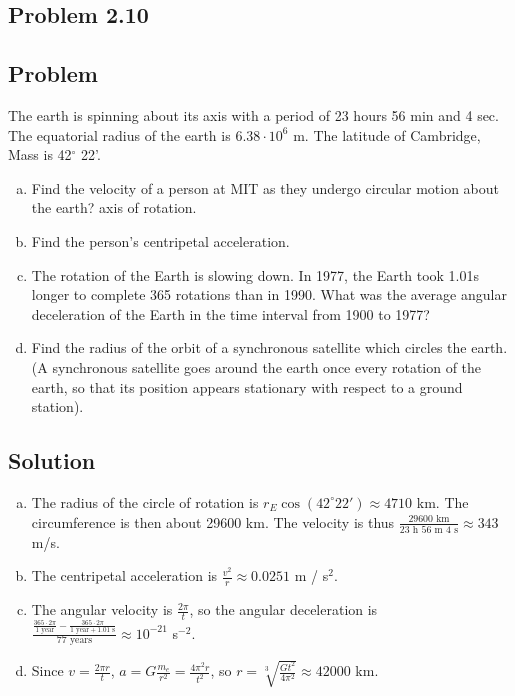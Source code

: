 \documentclass{esg8012pset}
\begin{document}
\begin{question}[Problem 2]
\section*{Problem 2.10}
\subsection*{Problem} The earth is spinning about its axis with a period of 23 hours 56 min and 4 sec. The equatorial radius of the earth is $6.38\cdot 10^{6}$ m. The latitude of Cambridge, Mass is 42$^{\circ}$ 22'.
\begin{enumerate}[a)]
  \item Find the velocity of a person at MIT as they undergo circular motion about the earth? axis of rotation.
  \item Find the person's centripetal acceleration.
  \item The rotation of the Earth is slowing down. In 1977, the Earth took 1.01s longer to complete 365 rotations than in 1990. What was the average angular deceleration of the Earth in the time interval from 1900 to 1977?
  \item Find the radius of the orbit of a synchronous satellite which circles the earth. (A synchronous satellite goes around the earth once every rotation of the earth, so that its position appears stationary with respect to a ground station).
\end{enumerate}
\subsection*{Solution}
\begin{enumerate}[a)]
  \item The radius of the circle of rotation is $r_E \cos(42^{\circ} 22') \approx 4710$ km.  The circumference is then about 29600 km.  The velocity is thus $\frac{29600\text{ km}}{23\text{ h }56\text{ m }4\text{ s}} \approx 343$ m/s.
  \item The centripetal acceleration is $\frac{v^2}{r} \approx 0.0251$ m / s$^2$.
  \item The angular velocity is $\frac{2\pi}{t}$, so the angular deceleration is $\frac{\frac{365\cdot 2\pi}{1\text{ year}} - \frac{365\cdot 2\pi}{1\text{ year}+1.01\text{ s}}}{77\text{ years}} \approx 10^{-21}$ s$^{-2}$. 
  \item Since $v = \frac{2\pi r}{t}$, $a = G\frac{m_e}{r^2} = \frac{4\pi^2 r}{t^2}$, so $r = \sqrt[3]{\frac{G t^2}{4\pi^2}} \approx 42000$ km.
\end{enumerate}


\end{question}
\end{document}
